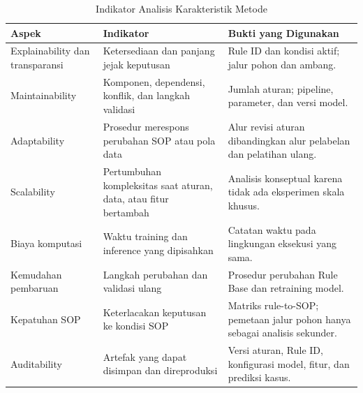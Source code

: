 \begin{table}[htbp]
    \centering
    \caption{Indikator Analisis Karakteristik Metode}
    \label{tab:indikator-karakteristik-metode}
    \scriptsize
    \renewcommand{\arraystretch}{1.2}
    \begin{tabularx}{\textwidth}{p{}p{}X}
        \toprule
        \textbf{Aspek} & \textbf{Indikator} & \textbf{Bukti yang Digunakan} \\
        \midrule
        Explainability dan transparansi & Ketersediaan dan panjang jejak keputusan & Rule ID dan kondisi aktif; jalur pohon dan ambang. \\
        Maintainability & Komponen, dependensi, konflik, dan langkah validasi & Jumlah aturan; pipeline, parameter, dan versi model. \\
        Adaptability & Prosedur merespons perubahan SOP atau pola data & Alur revisi aturan dibandingkan alur pelabelan dan pelatihan ulang. \\
        Scalability & Pertumbuhan kompleksitas saat aturan, data, atau fitur bertambah & Analisis konseptual karena tidak ada eksperimen skala khusus. \\
        Biaya komputasi & Waktu training dan inference yang dipisahkan & Catatan waktu pada lingkungan eksekusi yang sama. \\
        Kemudahan pembaruan & Langkah perubahan dan validasi ulang & Prosedur perubahan Rule Base dan retraining model. \\
        Kepatuhan SOP & Keterlacakan keputusan ke kondisi SOP & Matriks rule-to-SOP; pemetaan jalur pohon hanya sebagai analisis sekunder. \\
        Auditability & Artefak yang dapat disimpan dan direproduksi & Versi aturan, Rule ID, konfigurasi model, fitur, dan prediksi kasus. \\
        \bottomrule
    \end{tabularx}
\end{table}

\FloatBarrier



